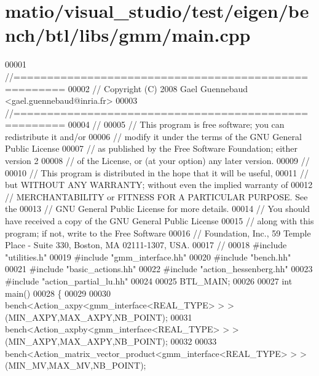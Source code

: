 \hypertarget{matio_2visual__studio_2test_2eigen_2bench_2btl_2libs_2gmm_2main_8cpp_source}{}\section{matio/visual\+\_\+studio/test/eigen/bench/btl/libs/gmm/main.cpp}
\label{matio_2visual__studio_2test_2eigen_2bench_2btl_2libs_2gmm_2main_8cpp_source}

\begin{DoxyCode}
00001 \textcolor{comment}{//=====================================================}
00002 \textcolor{comment}{// Copyright (C) 2008 Gael Guennebaud <gael.guennebaud@inria.fr>}
00003 \textcolor{comment}{//=====================================================}
00004 \textcolor{comment}{//}
00005 \textcolor{comment}{// This program is free software; you can redistribute it and/or}
00006 \textcolor{comment}{// modify it under the terms of the GNU General Public License}
00007 \textcolor{comment}{// as published by the Free Software Foundation; either version 2}
00008 \textcolor{comment}{// of the License, or (at your option) any later version.}
00009 \textcolor{comment}{//}
00010 \textcolor{comment}{// This program is distributed in the hope that it will be useful,}
00011 \textcolor{comment}{// but WITHOUT ANY WARRANTY; without even the implied warranty of}
00012 \textcolor{comment}{// MERCHANTABILITY or FITNESS FOR A PARTICULAR PURPOSE.  See the}
00013 \textcolor{comment}{// GNU General Public License for more details.}
00014 \textcolor{comment}{// You should have received a copy of the GNU General Public License}
00015 \textcolor{comment}{// along with this program; if not, write to the Free Software}
00016 \textcolor{comment}{// Foundation, Inc., 59 Temple Place - Suite 330, Boston, MA  02111-1307, USA.}
00017 \textcolor{comment}{//}
00018 \textcolor{preprocessor}{#include "utilities.h"}
00019 \textcolor{preprocessor}{#include "gmm\_interface.hh"}
00020 \textcolor{preprocessor}{#include "bench.hh"}
00021 \textcolor{preprocessor}{#include "basic\_actions.hh"}
00022 \textcolor{preprocessor}{#include "action\_hessenberg.hh"}
00023 \textcolor{preprocessor}{#include "action\_partial\_lu.hh"}
00024 
00025 BTL\_MAIN;
00026 
00027 \textcolor{keywordtype}{int} main()
00028 \{
00029 
00030   bench<Action\_axpy<gmm\_interface<REAL\_TYPE> > >(MIN\_AXPY,MAX\_AXPY,NB\_POINT);
00031   bench<Action\_axpby<gmm\_interface<REAL\_TYPE> > >(MIN\_AXPY,MAX\_AXPY,NB\_POINT);
00032 
00033   bench<Action\_matrix\_vector\_product<gmm\_interface<REAL\_TYPE> > >(MIN\_MV,MAX\_MV,NB\_POINT);

\end{DoxyCode}

